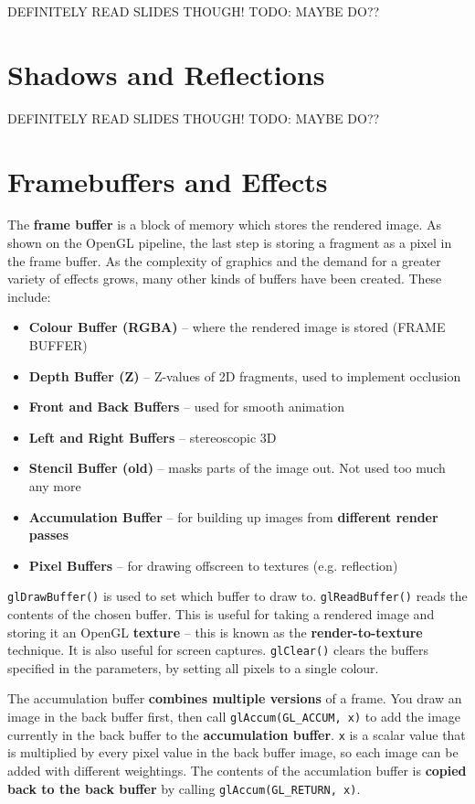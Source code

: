 \documentclass{article}
\begin{document}
DEFINITELY READ SLIDES THOUGH!
TODO: MAYBE DO??

\section{Shadows and Reflections}

DEFINITELY READ SLIDES THOUGH!
TODO: MAYBE DO??

\section{Framebuffers and Effects}

The \textbf{frame buffer} is a block of memory which stores the rendered image. As shown on the OpenGL pipeline, the last step is storing a fragment as a pixel in the frame buffer. As the complexity of graphics and the demand for a greater variety of effects grows, many other kinds of buffers have been created. These include:
\begin{itemize}
	\item \textbf{Colour Buffer (RGBA)} -- where the rendered image is stored (FRAME BUFFER)
	\item \textbf{Depth Buffer (Z)} -- Z-values of 2D fragments, used to implement occlusion
	\item \textbf{Front and Back Buffers} -- used for smooth animation
	\item \textbf{Left and Right Buffers} -- stereoscopic 3D
	\item \textbf{Stencil Buffer (old)} -- masks parts of the image out. Not used too much any more
	\item \textbf{Accumulation Buffer} -- for building up images from \textbf{different render passes}
	\item \textbf{Pixel Buffers} -- for drawing offscreen to textures (e.g. reflection)
\end{itemize}

\texttt{glDrawBuffer()} is used to set which buffer to draw to. \texttt{glReadBuffer()} reads the contents of the chosen buffer. This is useful for taking a rendered image and storing it an OpenGL \textbf{texture} -- this is known as the \textbf{render-to-texture} technique. It is also useful for screen captures. \texttt{glClear()} clears the buffers specified in the parameters, by setting all pixels to a single colour.

The accumulation buffer \textbf{combines multiple versions} of a frame. You draw an image in the back buffer first, then call \texttt{glAccum(GL\_ACCUM, x)} to add the image currently in the back buffer to the \textbf{accumulation buffer}. \texttt{x} is a scalar value that is multiplied by every pixel value in the back buffer image, so each image can be added with different weightings. The contents of the accumlation buffer is \textbf{copied back to the back buffer} by calling \texttt{glAccum(GL\_RETURN, x)}.
\end{document}
